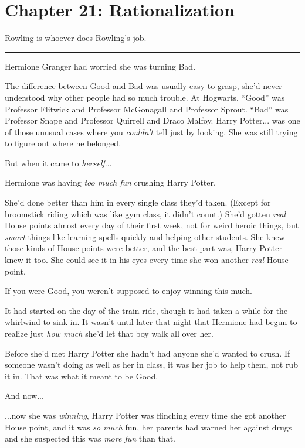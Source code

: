 \chapter{Chapter 21: Rationalization}
Rowling is whoever does Rowling's job.

\begin{center}\rule{3in}{0.4pt}\end{center}

Hermione Granger had worried she was turning Bad.

The difference between Good and Bad was usually easy to grasp, she'd
never understood why other people had so much trouble. At Hogwarts,
``Good'' was Professor Flitwick and Professor McGonagall and Professor
Sprout. ``Bad'' was Professor Snape and Professor Quirrell and Draco
Malfoy. Harry Potter... was one of those unusual cases where you
\emph{couldn't} tell just by looking. She was still trying to figure out
where he belonged.

But when it came to \emph{herself}...

Hermione was having \emph{too much fun} crushing Harry Potter.

She'd done better than him in every single class they'd taken. (Except
for broomstick riding which was like gym class, it didn't count.) She'd
gotten \emph{real} House points almost every day of their first week,
not for weird heroic things, but \emph{smart} things like learning
spells quickly and helping other students. She knew those kinds of House
points were better, and the best part was, Harry Potter knew it too. She
could see it in his eyes every time she won another \emph{real} House
point.

If you were Good, you weren't supposed to enjoy winning this much.

It had started on the day of the train ride, though it had taken a while
for the whirlwind to sink in. It wasn't until later that night that
Hermione had begun to realize just \emph{how much} she'd let that boy
walk all over her.

Before she'd met Harry Potter she hadn't had anyone she'd wanted to
crush. If someone wasn't doing as well as her in class, it was her job
to help them, not rub it in. That was what it meant to be Good.

And now...

...now she was \emph{winning}, Harry Potter was flinching every
time she got another House point, and it was \emph{so much} fun, her
parents had warned her against drugs and she suspected this was
\emph{more fun} than that.

